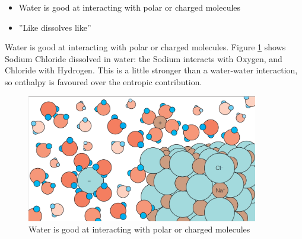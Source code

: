 \documentclass[]{article}
\begin{document}
\begin{itemize}
	\item Water is good at interacting with polar or charged molecules
	\item ''Like dissolves like''
\end{itemize}

Water is good at interacting with polar or charged molecules. Figure \ref{fig:NonCovalentBonds} shows Sodium Chloride dissolved in water: the Sodium interacts with Oxygen, and Chloride with Hydrogen. This is a little stronger than a water-water interaction, so enthalpy is favoured over the entropic contribution.
\begin{figure}[H]
	\caption{Water is good at interacting with polar or charged
		molecules} \label{fig:NonCovalentBonds} 
	\includegraphics[width=0.9\textwidth]{NonCovalentBonds}
\end{figure}
\end{document}
